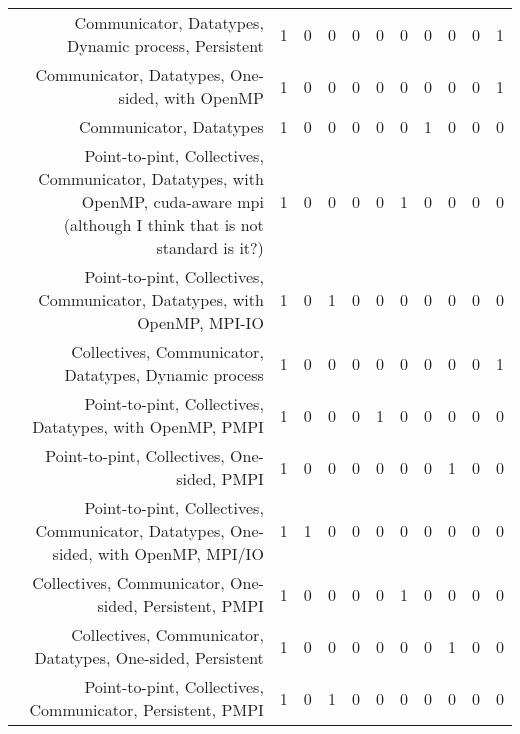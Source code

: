 {\begin{landscape}
\begin{longtable}[htb]{r|c|c|c|c|c|c|c|c|c|c}
{Communicator, Datatypes, Dynamic process, Persistent} & 1 & 0 & 0 & 0 & 0 & 0 & 0 & 0 & 0 & 1 \\%
{Communicator, Datatypes, One-sided, with OpenMP} & 1 & 0 & 0 & 0 & 0 & 0 & 0 & 0 & 0 & 1 \\%
{Communicator, Datatypes} & 1 & 0 & 0 & 0 & 0 & 0 & 1 & 0 & 0 & 0 \\%
{Point-to-pint, Collectives, Communicator, Datatypes, with OpenMP, cuda-aware mpi (although I think that is not standard is it?)} & 1 & 0 & 0 & 0 & 0 & 1 & 0 & 0 & 0 & 0 \\%
{Point-to-pint, Collectives, Communicator, Datatypes, with OpenMP, MPI-IO} & 1 & 0 & 1 & 0 & 0 & 0 & 0 & 0 & 0 & 0 \\%
{Collectives, Communicator, Datatypes, Dynamic process} & 1 & 0 & 0 & 0 & 0 & 0 & 0 & 0 & 0 & 1 \\%
{Point-to-pint, Collectives, Datatypes, with OpenMP, PMPI} & 1 & 0 & 0 & 0 & 1 & 0 & 0 & 0 & 0 & 0 \\%
{Point-to-pint, Collectives, One-sided, PMPI} & 1 & 0 & 0 & 0 & 0 & 0 & 0 & 1 & 0 & 0 \\%
{Point-to-pint, Collectives, Communicator, Datatypes, One-sided, with OpenMP, MPI/IO} & 1 & 1 & 0 & 0 & 0 & 0 & 0 & 0 & 0 & 0 \\%
{Collectives, Communicator, One-sided, Persistent, PMPI} & 1 & 0 & 0 & 0 & 0 & 1 & 0 & 0 & 0 & 0 \\%
{Collectives, Communicator, Datatypes, One-sided, Persistent} & 1 & 0 & 0 & 0 & 0 & 0 & 0 & 1 & 0 & 0 \\%
{Point-to-pint, Collectives, Communicator, Persistent, PMPI} & 1 & 0 & 1 & 0 & 0 & 0 & 0 & 0 & 0 & 0 \\%
\hline%
\end{longtable}%
\end{landscape}}%
\clearpage%
